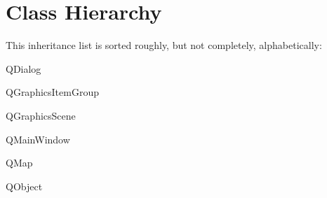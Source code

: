 \section{Class Hierarchy}
This inheritance list is sorted roughly, but not completely, alphabetically\+:\begin{DoxyCompactList}
\item Q\+Dialog\begin{DoxyCompactList}
\item {}
\item {}
\end{DoxyCompactList}
\item Q\+Graphics\+Item\+Group\begin{DoxyCompactList}
\item {}
\end{DoxyCompactList}
\item Q\+Graphics\+Scene\begin{DoxyCompactList}
\item {}
\end{DoxyCompactList}
\item Q\+Main\+Window\begin{DoxyCompactList}
\item {}
\end{DoxyCompactList}
\item Q\+Map\begin{DoxyCompactList}
\item {}
\end{DoxyCompactList}
\item Q\+Object\begin{DoxyCompactList}
\item {}
\item {}
\begin{DoxyCompactList}
\item {}
\item {}

\end{DoxyCompactList}
\end{DoxyCompactList}
\end{DoxyCompactList}
